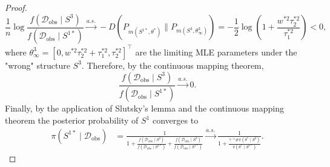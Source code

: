 \documentclass[accepted]{uai2026} %
\newcommand{\train}{\mathcal{D}}
\newcommand{\obsdata}{\train_{\text{obs}}}
\newcommand{\tsone}{\tau_1^{*2}}
\newcommand{\tstwo}{\tau_2^{*2}}
\def\transpose{\intercal}
\theoremstyle{boldremark}
\begin{document}
\begin{proof}
    \begin{equation}
        \frac{1}{n} \log \frac{f(\obsdata\mid S^3)}{f(\obsdata\mid S^{1*})} \xrightarrow{a.s.} -D(P_{m(S^{1*},\theta^*)} \| P_{m(S^3, \theta^3_\infty)}) = -\frac{1}{2}\log \left(1+\frac{w^{*2}\tstwo}{\tsone} \right) < 0,
    \end{equation}
    where $\theta^3_\infty  = [0, w^{*2}\tstwo+\tsone, \tstwo]^\transpose$ are the limiting MLE parameters under the "wrong" structure $S^3$. Therefore, by the continuous mapping theorem, 
    $$\frac{f(\obsdata\mid S^3)}{f(\obsdata\mid S^{1*})} \xrightarrow{a.s.} 0.$$
    Finally, by the application of Slutsky's lemma and the continuous mapping theorem the posterior probability of $S^1$ converges to
    \begin{align*}
        \pi(S^{1*}\mid \obsdata) &= \frac{1}{1 + \frac{f(\obsdata\mid S^2)}{f(\obsdata\mid S^{1*})} + \frac{f(\obsdata\mid S^3)}{f(\obsdata\mid S^{1*})}} \xrightarrow{a.s.} \frac{1}{1 + \frac{\gamma^{-1} \# \pi(\theta^*\mid S^2)}{\pi(\theta^*\mid S^{1*})}}.
    \end{align*}
\end{proof}
\end{document}
